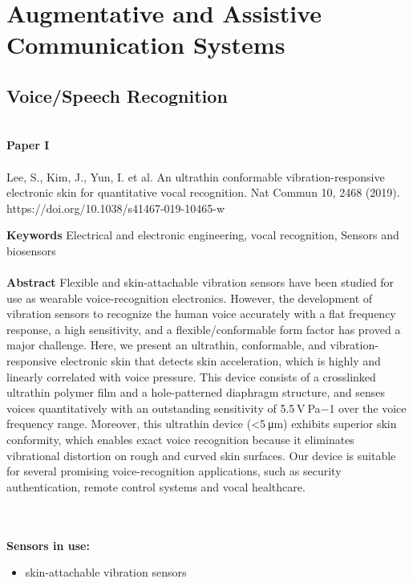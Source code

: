 \section{Augmentative and Assistive Communication Systems}
\lipsum[1]

\subsection{Voice/Speech Recognition}
\noindent
\\ 
\textbf{Paper I} 
\\ \\
\noindent
Lee, S., Kim, J., Yun, I. et al. An ultrathin conformable vibration-responsive electronic skin for quantitative vocal recognition. Nat Commun 10, 2468 (2019). https://doi.org/10.1038/s41467-019-10465-w

\noindent
\textbf{Keywords} Electrical and electronic engineering, vocal recognition, Sensors and biosensors
\\ \\

\noindent
\textbf{Abstract} Flexible and skin-attachable vibration sensors have been studied for use as wearable voice-recognition electronics. However, the development of vibration sensors to recognize the human voice accurately with a flat frequency response, a high sensitivity, and a flexible/conformable form factor has proved a major challenge. Here, we present an ultrathin, conformable, and vibration-responsive electronic skin that detects skin acceleration, which is highly and linearly correlated with voice pressure. This device consists of a crosslinked ultrathin polymer film and a hole-patterned diaphragm structure, and senses voices quantitatively with an outstanding sensitivity of 5.5 V Pa−1 over the voice frequency range. Moreover, this ultrathin device (<5 μm) exhibits superior skin conformity, which enables exact voice recognition because it eliminates vibrational distortion on rough and curved skin surfaces. Our device is suitable for several promising voice-recognition applications, such as security authentication, remote control systems and vocal healthcare.

\\ \\

\noindent
\textbf{Sensors in use:}
\begin{itemize}
    \item skin-attachable vibration sensors \\ \\
\end{itemize}


